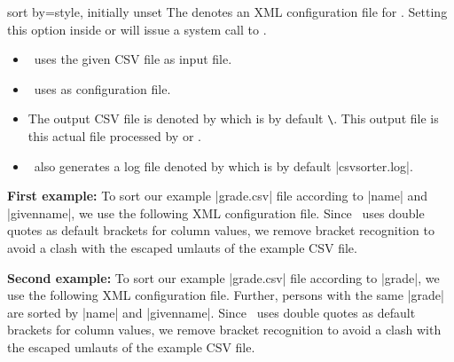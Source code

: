 \documentclass[a4paper,11pt]{ltxdoc}
\begin{document}
\begin{docCsvKey}{sort by}{=}{style, initially unset}
  The  denotes an XML configuration file for \csvsorter.
  Setting this option inside  or
   will issue a system call to \csvsorter.
  \begin{itemize}
  \item \csvsorter\ uses the given CSV file as input file.
  \item \csvsorter\ uses  as configuration file.
  \item The output CSV file is denoted by 
     which is by default \texttt{\textbackslash{}}.
     This output file is this actual file processed by  or .
  \item \csvsorter\ also generates a log file denoted by  which is by default |csvsorter.log|.
  \end{itemize}

\par\medskip\textbf{First example:}
  To sort our example |grade.csv| file according to |name| and |givenname|, we
  use the following XML configuration file. Since \csvsorter\ uses double quotes
  as default brackets for column values, we remove bracket recognition to avoid
  a clash with the escaped umlauts of the example CSV file.\par\smallskip

\begin{dispExample}
\end{dispExample}

\clearpage\textbf{Second example:}
  To sort our example |grade.csv| file according to |grade|, we
  use the following XML configuration file. Further, persons with the same |grade|
  are sorted by |name| and |givenname|. Since \csvsorter\ uses double quotes
  as default brackets for column values, we remove bracket recognition to avoid
  a clash with the escaped umlauts of the example CSV file.\par\smallskip

\begin{dispExample}
\end{dispExample}


\end{docCsvKey}
\end{document}
